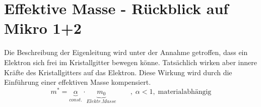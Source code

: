 \section{Effektive Masse - Rückblick auf Mikro 1+2}
Die Beschreibung der Eigenleitung wird unter der Annahme getroffen, dass ein Elektron sich frei im Kristallgitter bewegen könne. Tatsächlich wirken aber innere Kräfte des Kristallgitters auf das Elektron. Diese Wirkung wird durch die Einführung einer effektiven Masse kompensiert.
	\begin{equation}
		m^* = \underbrace{\alpha}_{const.} \cdot \underbrace{m_0}_{Elektr. Masse} \qquad ,\; \alpha < 1,\; \text{materialabhängig}
	\end{equation}
